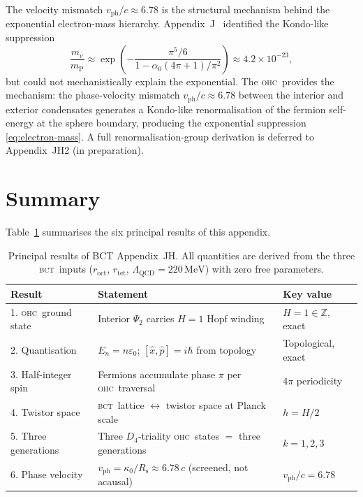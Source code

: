 \documentclass[aps,prl,preprint,superscriptaddress,floatfix]{revtex4-2}
\newcommand{\roct}{r_{\mathrm{oct}}}
\newcommand{\rtet}{r_{\mathrm{tet}}}
\newcommand{\az}{\alpha_0}
\newcommand{\mP}{m_{\mathrm{P}}}
\newcommand{\LQCD}{\Lambda_{\mathrm{QCD}}}
\newcommand{\BCT}{\textsc{bct}}
\newcommand{\OHC}{\textsc{ohc}}
\newcommand{\Psiint}{\Psi_2}
\newcommand{\Rsph}{R_{\mathrm{s}}}
\newcommand{\kz}{\kappa_0}
\newcommand{\HopfN}{H}
\newcommand{\vph}{v_{\mathrm{ph}}}
\begin{document}
The velocity mismatch $\vph/c\approx 6.78$ is the structural mechanism
behind the exponential electron-mass hierarchy.
Appendix~J~\cite{AppJ} identified the Kondo-like suppression
\begin{equation}
  \frac{m_e}{\mP}
  \approx \exp\!\left(-\frac{\pi^5/6}{1-\az(4\pi+1)/\pi^2}\right)
  \approx 4.2\times 10^{-23},
  \label{eq:electron-mass}
\end{equation}
but could not mechanistically explain the exponential.
The \OHC\ provides the mechanism: the phase-velocity mismatch
$\vph/c\approx 6.78$ between the interior and exterior condensates
generates a Kondo-like renormalisation of the fermion self-energy at
the sphere boundary, producing the exponential suppression \eqref{eq:electron-mass}.
A full renormalisation-group derivation is deferred to
Appendix~JH2 (in preparation).

\section{Summary}
\label{sec:summary}

Table~\ref{tab:results} summarises the six principal results of this appendix.

\begin{table}[h]
\centering
\caption{Principal results of BCT Appendix~JH.
All quantities are derived from the three \BCT\ inputs
($\roct$, $\rtet$, $\LQCD=220\,\mathrm{MeV}$) with zero free parameters.}
\label{tab:results}
\begin{tabular}{lll}
\toprule
\textbf{Result} & \textbf{Statement} & \textbf{Key value} \\
\midrule
1. \OHC\ ground state
  & Interior $\Psiint$ carries $\HopfN=1$ Hopf winding
  & $\HopfN = 1 \in \mathbb{Z}$, exact \\
2. Quantisation
  & $E_n = n\varepsilon_0$; $[\hat{x},\hat{p}]=i\hbar$ from topology
  & Topological, exact \\
3. Half-integer spin
  & Fermions accumulate phase $\pi$ per \OHC\ traversal
  & $4\pi$ periodicity \\
4. Twistor space
  & \BCT\ lattice $\leftrightarrow$ twistor space at Planck scale
  & $h = \HopfN/2$ \\
5. Three generations
  & Three $D_4$-triality \OHC\ states $= $ three generations
  & $k = 1,2,3$ \\
6. Phase velocity
  & $\vph = \kz/\Rsph \approx 6.78\,c$ (screened, not acausal)
  & $\vph/c = 6.78$ \\
\bottomrule
\end{tabular}
\end{table}
\end{document}
